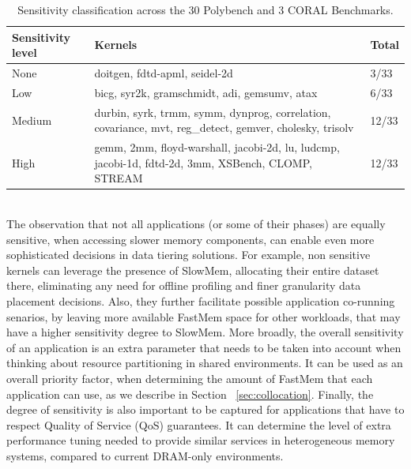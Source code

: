 \begin{table}[t]
\centering
{%
    \begin{tabular}{|p{1.4cm}|p{5.5cm}|p{0.6cm}|} \hline
	\textbf{Sensitivity \newline level} & \textbf{Kernels} & \textbf{Total} \\ \hline \hline
	None & doitgen, fdtd-apml, seidel-2d & 3/33 \\ \hline
	Low  & bicg, syr2k, gramschmidt, adi, gemsumv, atax & 6/33 \\ \hline
	Medium & durbin, syrk, trmm, symm, dynprog, correlation, covariance, mvt, reg\_detect, gemver, cholesky, trisolv & 12/33 \\ \hline
	High & gemm, 2mm, floyd-warshall, jacobi-2d, lu, ludcmp, jacobi-1d, fdtd-2d, 3mm, XSBench, CLOMP, STREAM & 12/33 \\ \hline
    \end{tabular}
}
\caption{Sensitivity classification across the 30 Polybench and 3 CORAL Benchmarks.}
\label{tbl:poly_class}
\vspace{-0.3in}
\end{table}


\\
The observation that not all applications (or some of their phases) are equally sensitive, when accessing slower memory components, can enable even more sophisticated decisions in data tiering solutions.
For example, non sensitive kernels can leverage the presence of SlowMem, allocating their entire dataset there, eliminating any need for offline profiling and finer granularity data placement decisions. 
Also, they further facilitate possible application co-running senarios, by leaving more available FastMem space for other workloads, that may have a higher sensitivity degree to SlowMem. 
More broadly, the overall sensitivity of an application is an extra parameter that needs to be taken into account when thinking about resource partitioning in shared environments. It can be used as an 
overall priority factor, when determining the amount of FastMem that each application can use, as we describe in Section ~\ref{sec:collocation}. Finally, the degree of sensitivity is also 
important to be captured for applications that have to respect Quality of Service (QoS) guarantees. It can determine the level of extra performance tuning needed to provide similar services in heterogeneous 
memory systems, compared to current DRAM-only environments.


